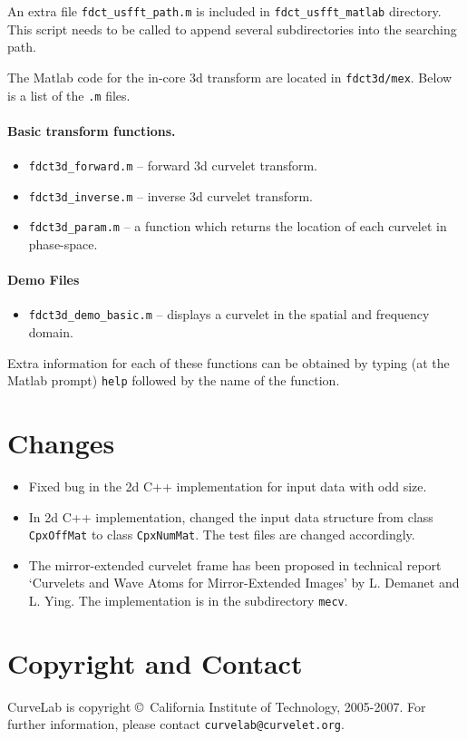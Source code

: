 \documentclass[11pt]{article}
\begin{document}
An extra file \verb=fdct_usfft_path.m= is included in
\verb=fdct_usfft_matlab= directory. This script needs to be called to
append several subdirectories into the searching path.

The Matlab code for the in-core 3d transform are located in
\verb=fdct3d/mex=. Below is a list of the \verb=.m= files.

\paragraph{Basic transform functions.}
\begin{itemize}
\item  \verb=fdct3d_forward.m= -- forward 3d curvelet transform.
\item  \verb=fdct3d_inverse.m= -- inverse 3d curvelet transform.
\item  \verb=fdct3d_param.m= -- a function which returns the location
  of each curvelet in phase-space.
\end{itemize}

\paragraph{Demo Files}
\begin{itemize}
\item  \verb=fdct3d_demo_basic.m= -- displays a curvelet in the spatial and frequency domain.
\end{itemize}

Extra information for each of these functions can be obtained by
typing (at the Matlab prompt) \verb=help= followed by the name of the
function.

\section{Changes}
\begin{itemize}
\item Fixed bug in the 2d C++ implementation for input data with odd
  size.
\item In 2d C++ implementation, changed the input data structure from
  class \verb=CpxOffMat= to class \verb=CpxNumMat=. The test files are
  changed accordingly.
\item The mirror-extended curvelet frame has been proposed in
  technical report `Curvelets and Wave Atoms for Mirror-Extended
  Images' by L. Demanet and L. Ying. The implementation is
  in the subdirectory \verb=mecv=.
\end{itemize}

\section{Copyright and Contact}
CurveLab is copyright \copyright $\,$ California Institute of
Technology, 2005-2007. For further information, please contact
\verb=curvelab@curvelet.org=.
\end{document}
